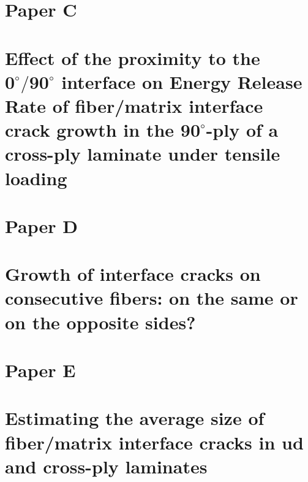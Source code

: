 \section{Paper C}
\section*{Effect of the proximity to the $\mathbf{0^{\circ}/90^{\circ}}$ interface on Energy Release Rate of fiber/matrix interface crack growth in the  $\mathbf{90^{\circ}}$-ply of a cross-ply laminate under tensile loading}

\section{Paper D}
\section*{Growth of interface cracks on consecutive fibers: on the same or on the opposite sides?}

\section{Paper E}
\section*{Estimating the average size of fiber/matrix interface cracks in ud and cross-ply laminates}
